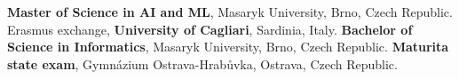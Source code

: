 %
%
%


\begin{scholarship}
					{\textbf{Master of Science in AI and ML}, Masaryk University, Brno, Czech Republic.}
					{Erasmus exchange, \textbf{University of Cagliari}, Sardinia, Italy.}
     			{\textbf{Bachelor of Science in Informatics}, Masaryk University, Brno, Czech Republic.}
     			{\textbf{Maturita state exam}, Gymnázium Ostrava-Hrabůvka, Ostrava, Czech Republic.}
\end{scholarship}

